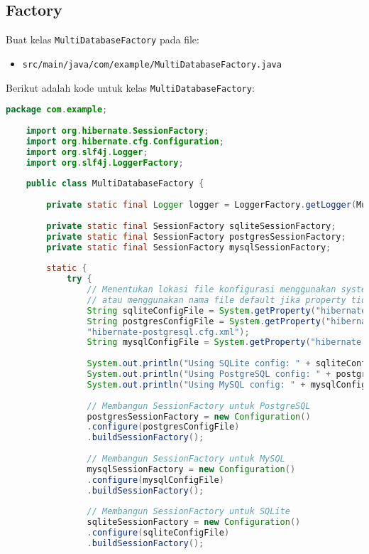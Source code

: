 \subsection{Factory}
Buat kelas \texttt{MultiDatabaseFactory} pada file:
\begin{itemize}
	\item \texttt{src/main/java/com/example/MultiDatabaseFactory.java}
\end{itemize}

Berikut adalah kode untuk kelas \texttt{MultiDatabaseFactory}:

\begin{lstlisting}[language=Java, style=JavaStyle]
	package com.example;
	
	import org.hibernate.SessionFactory;
	import org.hibernate.cfg.Configuration;
	import org.slf4j.Logger;
	import org.slf4j.LoggerFactory;
	
	public class MultiDatabaseFactory {
		
		private static final Logger logger = LoggerFactory.getLogger(MultiDatabaseFactory.class);
		
		private static final SessionFactory sqliteSessionFactory;
		private static final SessionFactory postgresSessionFactory;
		private static final SessionFactory mysqlSessionFactory;
		
		static {
			try {
				// Menentukan lokasi file konfigurasi menggunakan system properties,
				// atau menggunakan nama file default jika property tidak disediakan.
				String sqliteConfigFile = System.getProperty("hibernate.sqlite.config", "hibernate-sqlite.cfg.xml");
				String postgresConfigFile = System.getProperty("hibernate.postgresql.config",
				"hibernate-postgresql.cfg.xml");
				String mysqlConfigFile = System.getProperty("hibernate.mysql.config", "hibernate-mysql.cfg.xml");
				
				System.out.println("Using SQLite config: " + sqliteConfigFile);
				System.out.println("Using PostgreSQL config: " + postgresConfigFile);
				System.out.println("Using MySQL config: " + mysqlConfigFile);
				
				// Membangun SessionFactory untuk PostgreSQL
				postgresSessionFactory = new Configuration()
				.configure(postgresConfigFile)
				.buildSessionFactory();
				
				// Membangun SessionFactory untuk MySQL
				mysqlSessionFactory = new Configuration()
				.configure(mysqlConfigFile)
				.buildSessionFactory();
				
				// Membangun SessionFactory untuk SQLite
				sqliteSessionFactory = new Configuration()
				.configure(sqliteConfigFile)
				.buildSessionFactory();
				

\end{lstlisting}
